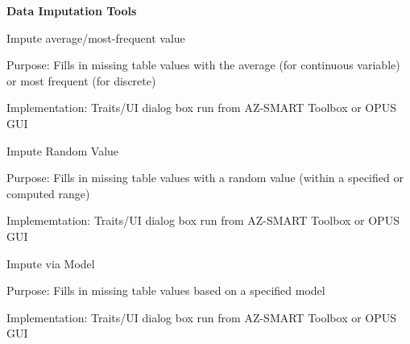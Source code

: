 \bigskip

\textbf{Data Imputation Tools}

\bigskip

Impute average/most-frequent value

Purpose: Fills in missing table values with the average (for continuous variable) or most frequent (for discrete)

Implementation: Traits/UI dialog box run from AZ-SMART Toolbox or OPUS GUI

\bigskip

Impute Random Value

Purpose: Fills in missing table values with a random value (within a specified or computed range)

Implememtation: Traits/UI dialog box run from AZ-SMART Toolbox or OPUS GUI

\bigskip

Impute via Model

Purpose: Fills in missing table values based on a specified model

Implementation: Traits/UI dialog box run from AZ-SMART Toolbox or OPUS GUI

\bigskip
